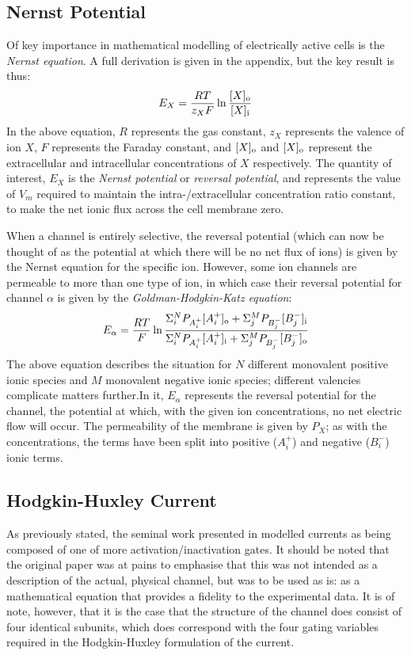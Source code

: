 \documentclass[../thesis-main.tex]{subfiles}
\begin{document}
\subsection{Nernst Potential}
\label{subsec:nernst}
Of key importance in mathematical modelling of electrically active cells is the \emph{Nernst equation}. A full derivation is given in the appendix, but the key result is thus:
\begin{equation}
 E_X = \frac{RT}{z_XF}\ln\frac{[X]_\textnormal{o}}{[X]_\textnormal{i}}
\end{equation}
In the above equation, $R$ represents the gas constant, $z_X$ represents the valence of ion $X$, $F$ represents the Faraday constant, and $[X]_\textnormal{o}$ and $[X]_\textnormal{o}$ represent the extracellular and intracellular concentrations of $X$ respectively. The quantity of interest, $E_X$ is the \emph{Nernst potential} or \emph{reversal potential}, and represents the value of $V_m$ required to maintain the intra-/extracellular concentration ratio constant, \idest{} to make the net ionic flux across the cell membrane zero.

When a channel is entirely selective, the reversal potential (which can now be thought of as the potential at which there will be no net flux of ions) is given by the Nernst equation for the specific ion. However, some ion channels are permeable to more than one type of ion, in which case their reversal potential for channel $\alpha$ is given by the \emph{Goldman-Hodgkin-Katz equation}:
\begin{equation}
 E_\alpha = \frac{RT}{F}\ln\frac{\Sigma_i^N P_{A_i^+}[A_i^+]_\textnormal{o} + \Sigma_j^M P_{B_j^-}[B_j^-]_\textnormal{i}}{\Sigma_i^N P_{A_i^+}[A_i^+]_\textnormal{i} + \Sigma_j^M P_{B_j^-}[B_j^-]_\textnormal{o}}
\end{equation}
The above equation describes the situation for $N$ different monovalent positive ionic species and $M$ monovalent negative ionic species; different valencies complicate matters further.In it, $E_\alpha$ represents the reversal potential for the channel, \idest{} the potential at which, with the given ion concentrations, no net electric flow will occur. The permeability of the membrane is given by $P_X$; as with the concentrations, the terms have been split into positive ($A_i^+$) and negative ($B_i^-$) ionic terms.

\subsection{Hodgkin-Huxley Current}
\label{subsec:hodgkin-huxley}
As previously stated, the seminal work presented in \citet{Hodgkin1952} modelled currents as being composed of one of more activation/inactivation gates. It should be noted that the original paper was at pains to emphasise that this was not intended as a description of the actual, physical channel, but was to be used as is: as a mathematical equation that provides a fidelity to the experimental data. It is of note, however, that it is the case that the structure of the \K{} channel does consist of four identical subunits, which does correspond with the four gating variables required in the Hodgkin-Huxley formulation of the current.
\end{document}
